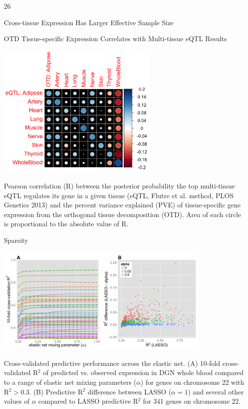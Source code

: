 \documentclass[final]{beamer}
\newcommand{\ColWidth}{26}
\begin{document}
\begin{frame}{}
\begin{textblock}{\ColWidth}
\begin{block}{Cross-tissue Expression Has Larger Effective Sample Size}
\end{block}


\begin{block}{OTD Tissue-specific Expression Correlates with Multi-tissue eQTL Results}
	\begin{center}
		\includegraphics[width=0.6\textwidth]{plots/Fig-cor-StephensPr-OTDtsPVE.png}
	\end{center}
	{\tiny Pearson correlation (R) between the posterior probability the top multi-tissue eQTL regulates its gene in a given tissue (eQTL, Flutre et al. method, PLOS Genetics 2013) and the percent variance explained (PVE) of tissue-specific gene expression from the orthogonal tissue decomposition (OTD). Area of each circle is proportional to the absolute value of R.\\}
\end{block}



\begin{block}{Sparsity}
	\begin{center}
		\includegraphics[width=0.8\textwidth]{plots/Fig3.png}
	 \end{center}
	 {\tiny Cross-validated predictive performance across the elastic net. (A) 10-fold cross-validated R$^2$ of predicted vs. observed expression in DGN whole blood compared to a range of elastic net mixing parameters ($\alpha$) for genes on chromosome 22 with R$^2 > 0.3$. (B) Predictive R$^2$  difference between LASSO ($\alpha=1$) and several other values of $\alpha$ compared to LASSO predictive R$^2$  for 341 genes on chromosome 22.\\}


\end{block}
\end{textblock}
\end{frame}
\end{document}
